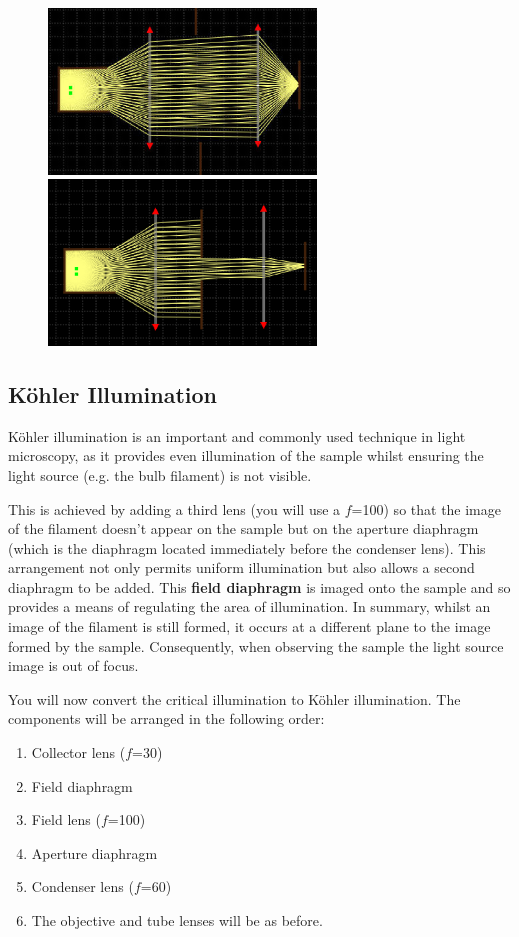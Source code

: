 \documentclass[a4paper]{report}
\begin{document}
\begin{figure}[h]
\center
\includegraphics[width=2.8in]{critical_open_iris.eps}
\includegraphics[width=2.8in]{critical_closed_iris.eps}
\caption{}
\label{fig:critical_iris}
\end{figure}



\clearpage

\subsection{K\"{o}hler Illumination}
K\"{o}hler illumination is an important and commonly used technique in light microscopy, as it provides even illumination of the sample whilst ensuring the light source (e.g. the bulb filament) is not visible. 

This is achieved by adding a third lens (you will use a
$f$=100) so that the image of the filament doesn't appear on the
sample but on the aperture diaphragm (which is the diaphragm located
immediately before the condenser lens). This arrangement not only
permits uniform illumination but also allows a second diaphragm to be
added. This \textbf{field diaphragm} is imaged onto the sample and so
provides a means of regulating the area of illumination. In summary,
whilst an image of the filament is still formed, it occurs at a
different plane to the image formed by the sample. Consequently, when
observing the sample the light source image is out of focus.

You will now convert the critical illumination to K\"{o}hler
illumination.  The components will be arranged in the following order:
\begin{enumerate}
\item Collector lens ($f$=30)
\item Field diaphragm
\item Field lens ($f$=100)
\item Aperture diaphragm
\item Condenser lens ($f$=60)
\item The objective and tube lenses will be as before. 
\end{enumerate}
\end{document}

